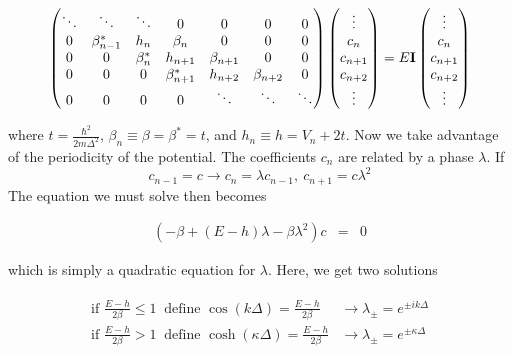 \documentclass[11pt]{article}
\begin{document}
\begin{equation}
\begin{pmatrix}
\ddots & \ddots         & \ddots       & 0         & 0      & 0       & 0 \\
0 & \beta_{n-1}^* & h_n          & \beta_n        & 0       & 0      & 0 \\
0 & 0        & \beta_{n}^* & h_{n+1}         & \beta_{n+1} & 0      & 0 \\
0 & 0        & 0       & \beta_{n+1}^*  & h_{n+2}      & \beta_{n+2} & 0\\
0 & 0         & 0       & 0          & \ddots       & \ddots       & \ddots 
\end{pmatrix}
\begin{pmatrix}
\vdots\\
c_n\\
c_{n+1}\\
c_{n+2}\\
\vdots
\end{pmatrix}
=
E{\bf I}
\begin{pmatrix}
\vdots\\
c_n\\
c_{n+1}\\
c_{n+2}\\
\vdots
\end{pmatrix}
\end{equation}

where \(t = \frac{\hbar^2}{2m \Delta^2}\),
\(\beta_n \equiv \beta = \beta^* = t\), and \(h_n \equiv h = V_n + 2t\).
Now we take advantage of the periodicity of the potential. The
coefficients \(c_n\) are related by a phase \(\lambda\). If
\[c_{n-1} = c \rightarrow c_n = \lambda c_{n-1},~c_{n+1} = c\lambda^2\]
The equation we must solve then becomes

\begin{eqnarray}
(-\beta + (E - h)\lambda - \beta\lambda^2)c &=& 0
\end{eqnarray}

which is simply a quadratic equation for \(\lambda\). Here, we get two
solutions

\begin{eqnarray}
\begin{array}{cc}
\text{if } \frac{E - h}{2\beta} \leq 1 ~ \text{ define } \cos(k\Delta) = \frac{E - h}{2\beta} & \rightarrow \lambda_{\pm} = e^{\pm i k \Delta}\\
\text{if } \frac{E - h}{2\beta} > 1 ~ \text{ define } \cosh(\kappa \Delta) = \frac{E - h}{2\beta} & \rightarrow \lambda_{\pm} = e^{\pm \kappa \Delta}
\end{array}
\end{eqnarray}
\end{document}
